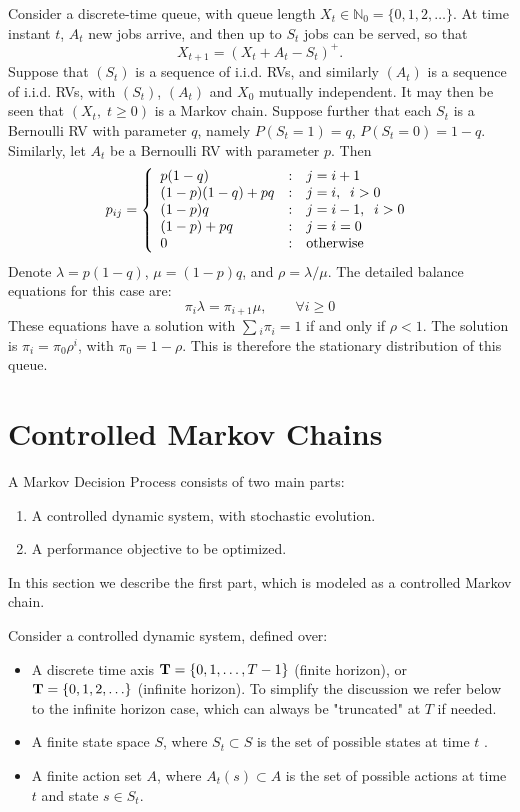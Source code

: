 \begin{example} Consider a discrete-time queue, with queue length $X_t\in \mathbb{N}_0=\{0,1,2,\dots\}$. At time instant $t$, ${A_t}$ new jobs arrive, and then up to ${S_t}$ jobs can be served, so that
\[{X_{t + 1}} = {({X_t} + {A_t} - {S_t})^ + }.\]
Suppose that $({S_t})$ is a sequence of i.i.d. RVs, and similarly $({A_t})$ is a sequence of i.i.d. RVs, with $({S_t})$, $({A_t})$ and ${X_0}$ mutually independent. It may then be seen that
$({X_t},\;t \ge 0)$ is a Markov chain.
Suppose further that each ${S_t}$ is a Bernoulli RV with parameter $q$, namely $P({S_t} = 1) = q$, $P({S_t} = 0) = 1 - q$. Similarly, let ${A_t}$ be a Bernoulli RV with parameter $p$. Then
\[{p_{ij}} = \left\{ {\begin{array}{*{20}{l}}
{p(1 - q)}&:&{j = i + 1}\\
{(1 - p)(1 - q) + pq}&:&{j = i,\;\;i > 0}\\
{(1 - p)q}&:&{j = i - 1,\;\;i > 0}\\
{(1 - p) + pq}&:&{j = i = 0}\\
0&:&{{\rm{otherwise}}}
\end{array}} \right.\]
 Denote $\lambda  = p(1 - q)$, $\mu  = (1 - p)q$, and $\rho  = \lambda /\mu $.   The detailed balance equations for this case are:
\[{\pi _i}\lambda  = {\pi _{i + 1}}\mu ,\quad \quad \forall i \ge 0\]
These equations have a solution with $\sum {_i{\pi _i} = 1}$ if and only if $\rho  < 1$. The solution is ${\pi _i} = {\pi _0}{\rho ^i}$, with ${\pi _0} = 1 - \rho $. This is therefore the stationary distribution of this queue.


\end{example}


\section{Controlled Markov Chains}

A Markov Decision Process consists of two main parts:
\begin{enumerate}
  \item A controlled dynamic system, with stochastic evolution.
  \item A performance objective to be optimized.
\end{enumerate}
In this section we describe the first part, which is modeled as a controlled Markov chain.

Consider a controlled dynamic system, defined over:
\begin{itemize}
  \item A discrete time axis ${\bf{T}} = \{ 0,1, \ldots ,T - 1\} $  (finite horizon), or ${\bf{T}} = \{ 0,1,2, \ldots \} $ (infinite horizon).
To simplify the discussion we refer below to the infinite horizon case, which can always be "truncated" at $T$ if needed.
  \item A finite state space $S$, where ${S_t} \subset S$ is the set of possible states at time $t$ .
  \item A finite action set $A$, where ${A_t}(s) \subset A$ is the set of possible actions at time $t$ and state $s \in {S_t}$.
\end{itemize}

